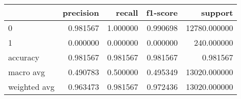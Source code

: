 \begin{tabular}{lrrrr}
\toprule
{} &  precision &    recall &  f1-score &       support \\
\midrule
0            &   0.981567 &  1.000000 &  0.990698 &  12780.000000 \\
1            &   0.000000 &  0.000000 &  0.000000 &    240.000000 \\
accuracy     &   0.981567 &  0.981567 &  0.981567 &      0.981567 \\
macro avg    &   0.490783 &  0.500000 &  0.495349 &  13020.000000 \\
weighted avg &   0.963473 &  0.981567 &  0.972436 &  13020.000000 \\
\bottomrule
\end{tabular}
